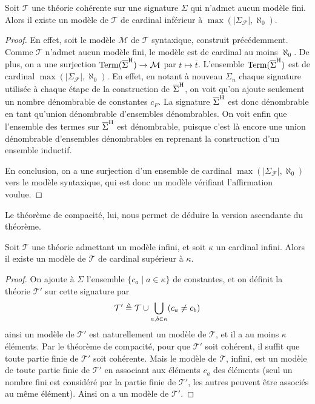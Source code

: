 \begin{theorem}
  Soit $\mathcal T$ une théorie cohérente sur une signature $\Sigma$ qui
  n'admet aucun modèle fini. Alors il existe un modèle de $\mathcal T$ de
  cardinal inférieur à $\max(|\Sigma_{\mathcal F}|,\aleph_0)$.
\end{theorem}

\begin{proof}
  En effet, soit le modèle $\mathcal M$ de $\mathcal T$ syntaxique, construit
  précédemment. Comme $\mathcal T$ n'admet aucun modèle fini, le modèle est de
  cardinal au moins $\aleph_0$. De plus, on a une surjection
  $\operatorname{Term}(\overline{\Sigma}^{\mathrm H}) \to \mathcal M$ par $t\mapsto \overline t$. L'ensemble
  $\operatorname{Term}(\overline{\Sigma}^{\mathrm H})$ est de cardinal $\max(|\Sigma_{\mathcal F}|,\aleph_0)$.
  En effet, en notant à nouveau $\Sigma_n$ chaque signature utilisée à chaque
  étape de la construction de $\overline{\Sigma}^{\mathrm H}$, on voit qu'on ajoute seulement
  un nombre dénombrable de constantes $c_F$. La signature $\overline{\Sigma}^{\mathrm H}$
  est donc dénombrable en tant qu'union dénombrable d'ensembles dénombrables.
  On voit enfin que l'ensemble des termes sur $\overline{\Sigma}^{\mathrm H}$ est dénombrable,
  puisque c'est là encore une union dénombrable d'ensembles dénombrables en
  reprenant la construction d'un ensemble inductif.

  En conclusion, on a une surjection d'un ensemble de cardinal
  $\max(|\Sigma_\mathcal F|,\aleph_0)$ vers le modèle syntaxique, qui est donc
  un modèle vérifiant l'affirmation voulue.
\end{proof}

Le théorème de compacité, lui, nous permet de déduire la version ascendante du
théorème.

\begin{theorem}
  Soit $\mathcal T$ une théorie admettant un modèle infini, et
  soit $\kappa$ un cardinal infini. Alors il existe un modèle
  de $\mathcal T$ de cardinal supérieur à $\kappa$.
\end{theorem}

\begin{proof}
  On ajoute à $\Sigma$ l'ensemble $\{c_a\mid a \in \kappa\}$ de constantes, et
  on définit la théorie $\mathcal T'$ sur cette signature par
  \[\mathcal T'\triangleq\mathcal T\cup \bigcup_{a,b\in \kappa}(c_a\neq c_b)\]
  ainsi un modèle de $\mathcal T'$ est naturellement un modèle de $\mathcal T$,
  et il a au moins $\kappa$ éléments. Par le théorème de compacité, pour
  que $\mathcal T'$ soit cohérent, il suffit que toute partie finie de
  $\mathcal T'$ soit cohérente. Mais le modèle de $\mathcal T$, infini, est
  un modèle de toute partie finie de $\mathcal T'$ en associant aux éléments
  $c_a$ des éléments (seul un nombre fini est considéré par la partie finie de
  $\mathcal T'$, les autres peuvent être associés au même élément). Ainsi on
  a un modèle de $\mathcal T'$.
\end{proof}

